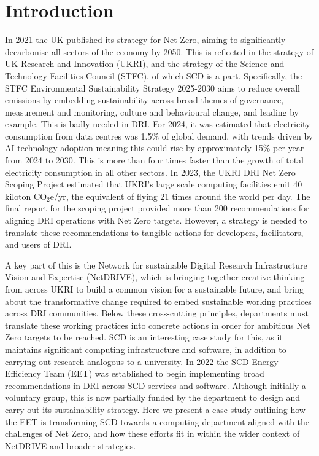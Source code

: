 \documentclass[sigconf]{acmart}
\begin{document}
\section{Introduction}
In 2021 the UK published its strategy for Net Zero, aiming to significantly decarbonise all sectors of the economy by 2050\cite{UKNetZeroStrategy}. This is reflected in the strategy of UK Research and Innovation (UKRI)\cite{UKRINetZeroStrategy}, and the strategy of the Science and Technology Facilities Council (STFC)\cite{STFCNetZeroStrategy}, of which SCD is a part. Specifically, the STFC Environmental Sustainability Strategy 2025-2030 aims to reduce overall emissions by embedding sustainability across broad themes of  governance, measurement and monitoring, culture and behavioural change, and leading by example\cite{STFCNetZeroStrategy}. This is badly needed in DRI. For 2024, it was estimated that electricity consumption from data centres was 1.5$\%$ of global demand, with trends driven by AI technology adoption meaning this could rise by approximately 15$\%$ per year from 2024 to 2030\cite{EnergyAI}. This is more than four times faster than the growth of total electricity consumption in all other sectors. In 2023, the UKRI DRI Net Zero Scoping Project estimated that UKRI's large scale computing facilities emit 40 kiloton CO$_2$e/yr\cite{DRINetZeroComputing}, the equivalent of flying 21 times around the world per day. The final report for the scoping project provided more than 200 recommendations for aligning DRI operations with Net Zero targets\cite{DRINetZeroScopingReport}. However, a strategy is needed to translate these recommendations to tangible actions for developers, facilitators, and users of DRI. 

A key part of this is the Network for sustainable Digital Research Infrastructure Vision and Expertise (NetDRIVE), which is bringing together creative thinking from across UKRI to build a common vision for a sustainable future, and bring about the transformative change required to embed sustainable working practices across DRI communities\cite{netdrive}. Below these cross-cutting principles, departments must translate these working practices into concrete actions in order for ambitious Net Zero targets to be reached. SCD is an interesting case study for this, as it maintains significant computing infrastructure and software, in addition to carrying out research analogous to a university. In 2022 the SCD Energy Efficiency Team (EET) was established to begin implementing broad recommendations in DRI across SCD services and software. Although initially a voluntary group, this is now partially funded by the department to design and carry out its sustainability strategy. Here we present a case study outlining how the EET is transforming SCD towards a computing department aligned with the challenges of Net Zero, and how these efforts fit in within the wider context of NetDRIVE and broader strategies. 
\end{document}
